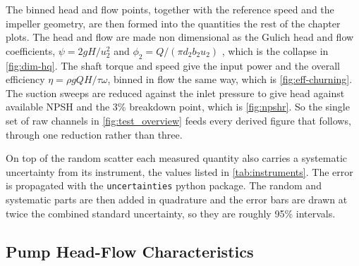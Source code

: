 The binned head and flow points, together with the reference speed and the impeller geometry, are then formed into the quantities the rest of the chapter plots. The head and flow are made non dimensional as the Gulich head and flow coefficients, $\psi = 2gH/u_2^2$ and $\phi_2 = Q/(\pi d_2 b_2 u_2)$ \cite{gulichCentrifugalPumps2020}, which is the collapse in \cref{fig:dim-hq}. The shaft torque and speed give the input power and the overall efficiency $\eta = \rho g Q H / \tau\omega$, binned in flow the same way, which is \cref{fig:eff-churning}. The suction sweeps are reduced against the inlet pressure to give head against available NPSH and the 3\% breakdown point, which is \cref{fig:npshr}. So the single set of raw channels in \cref{fig:test_overview} feeds every derived figure that follows, through one reduction rather than three.

On top of the random scatter each measured quantity also carries a systematic uncertainty from its instrument, the values listed in \cref{tab:instruments}. The error is propagated with the \texttt{uncertainties} python package. The random and systematic parts are then added in quadrature and the error bars are drawn at twice the combined standard uncertainty, so they are roughly 95\% intervals.%



\subsection{Pump Head-Flow Characteristics}

